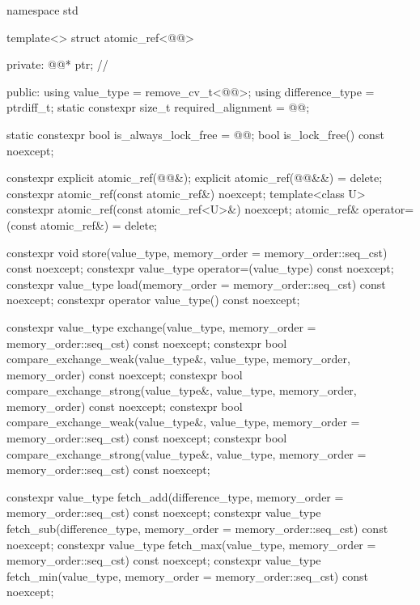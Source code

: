 \begin{codeblock}
namespace std {
  template<> struct atomic_ref<@@> {
  private:
    @@* ptr;        // \expos

  public:
    using value_type = remove_cv_t<@@>;
    using difference_type = ptrdiff_t;
    static constexpr size_t required_alignment = @@;

    static constexpr bool is_always_lock_free = @@;
    bool is_lock_free() const noexcept;

    constexpr explicit atomic_ref(@@&);
    explicit atomic_ref(@@&&) = delete;
    constexpr atomic_ref(const atomic_ref&) noexcept;
    template<class U>
      constexpr atomic_ref(const atomic_ref<U>&) noexcept;
    atomic_ref& operator=(const atomic_ref&) = delete;

    constexpr void store(value_type, memory_order = memory_order::seq_cst) const noexcept;
    constexpr value_type operator=(value_type) const noexcept;
    constexpr value_type load(memory_order = memory_order::seq_cst) const noexcept;
    constexpr operator value_type() const noexcept;

    constexpr value_type exchange(value_type,
                                  memory_order = memory_order::seq_cst) const noexcept;
    constexpr bool compare_exchange_weak(value_type&, value_type,
                                         memory_order, memory_order) const noexcept;
    constexpr bool compare_exchange_strong(value_type&, value_type,
                                           memory_order, memory_order) const noexcept;
    constexpr bool compare_exchange_weak(value_type&, value_type,
                                         memory_order = memory_order::seq_cst) const noexcept;
    constexpr bool compare_exchange_strong(value_type&, value_type,
                                           memory_order = memory_order::seq_cst) const noexcept;

    constexpr value_type fetch_add(difference_type,
                                   memory_order = memory_order::seq_cst) const noexcept;
    constexpr value_type fetch_sub(difference_type,
                                   memory_order = memory_order::seq_cst) const noexcept;
    constexpr value_type fetch_max(value_type,
                                   memory_order = memory_order::seq_cst) const noexcept;
    constexpr value_type fetch_min(value_type,
                                   memory_order = memory_order::seq_cst) const noexcept;

}}
\end{codeblock}
